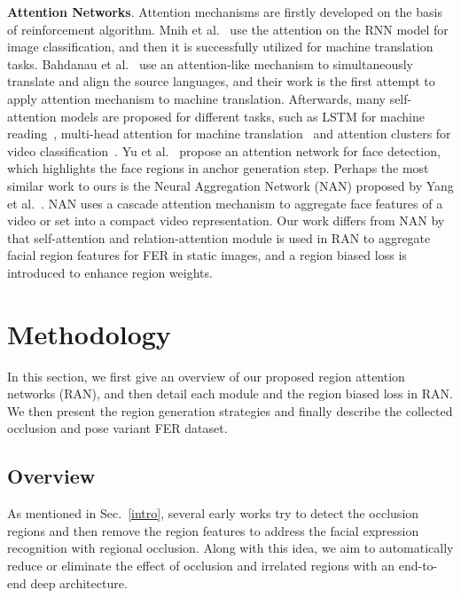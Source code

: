 \documentclass[journal]{IEEEtran}
\newcommand{\pxj}[1]{\textcolor[rgb]{0,0,0}{#1}}
\begin{document}
\textbf{Attention Networks}.
\pxj{
Attention mechanisms are firstly developed on the basis of reinforcement algorithm. Mnih et al.~\cite{NIPS2014_5542} use the attention on the RNN model for image classification, and then it is successfully utilized for machine translation tasks. Bahdanau et al.~\cite{bengio} use an attention-like mechanism to simultaneously translate and align the source languages, and their work is the first attempt to apply attention mechanism to machine translation. Afterwards, many self-attention models are proposed for different tasks, such as LSTM for machine reading~\cite{ChengDL16}, multi-head attention for machine translation~\cite{NIPS2017_7181} and attention clusters for video classification~\cite{longxiang}. 
Yu et al.~\cite{attention_wang} propose an attention network for face detection, which highlights the face regions in anchor generation step.
Perhaps the most similar work to ours is the Neural Aggregation Network (NAN) proposed by Yang et al.~\cite{YangRCWLH16}. NAN uses a cascade attention mechanism to aggregate face features of a video or set into a compact video representation. Our work differs from NAN by that self-attention and relation-attention module is used in RAN to aggregate facial region features for FER in static images, and a region biased loss is introduced to enhance region weights. }


 


\section{Methodology}
\label{method}
In this section, we first give an overview of our proposed region attention networks (RAN), and then detail each module and the region biased loss in RAN. We then present the region generation strategies and finally describe the collected occlusion and pose variant FER dataset.
\subsection{Overview}
As mentioned in Sec.~\ref{intro}, several early works try to detect the occlusion regions and then remove the region features to address the facial expression recognition with regional occlusion. Along with this idea, we aim to automatically reduce or eliminate the effect of occlusion and irrelated regions with an end-to-end deep architecture.
\end{document}
